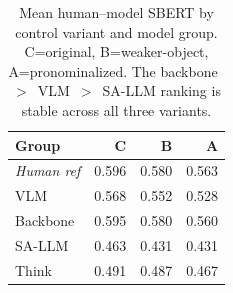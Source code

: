 \begin{table}[h]
\centering
\small
\caption{Mean human--model SBERT by control variant and model group. C=original, B=weaker-object, A=pronominalized. The backbone~$>$~VLM~$>$~SA-LLM ranking is stable across all three variants.}
\label{tab:robustness_variant_ranking}
\begin{tabular}{lrrr}
\toprule
Group & C & B & A \\
\midrule
\textit{Human ref} & 0.596 & 0.580 & 0.563 \\
\midrule
VLM & 0.568 & 0.552 & 0.528 \\
Backbone & 0.595 & 0.580 & 0.560 \\
SA-LLM & 0.463 & 0.431 & 0.431 \\
Think & 0.491 & 0.487 & 0.467 \\
\bottomrule
\end{tabular}
\end{table}
